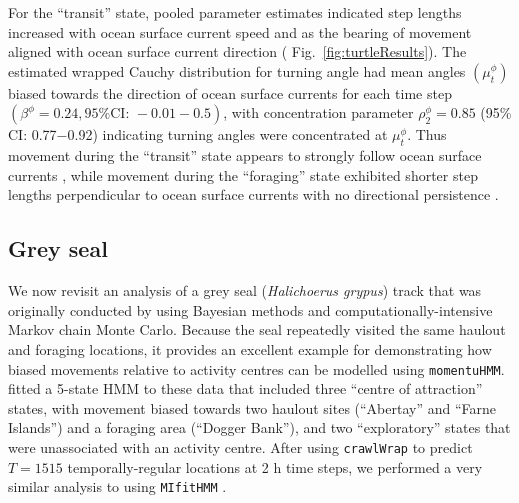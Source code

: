 \documentclass[12pt]{article}\usepackage[]{graphicx}\usepackage[]{color}
\begin{document}
For the ``transit'' state, pooled parameter estimates indicated step lengths increased with ocean surface current speed and as the bearing of movement aligned with ocean surface current direction (%
Fig.\ \ref{fig:turtleResults}). The estimated wrapped Cauchy distribution for turning angle had mean angles $(\mu^\phi_t)$ biased towards the direction of ocean surface currents for each time step $(\beta^\phi=0.24, \text{95\% CI: } -0.01-0.5)$, with concentration parameter $\rho^\phi_2=0.85$ (95\% CI: 0.77$-$0.92) indicating turning angles were concentrated at $\mu^\phi_t$. Thus movement during the ``transit'' state appears to strongly follow ocean surface currents%
, while movement during the ``foraging'' state exhibited shorter step lengths %
perpendicular to ocean surface currents %
with no directional persistence%
. %

\subsection{Grey seal}
\label{sec:greySeal}
We now revisit an analysis of a grey seal ({\it Halichoerus grypus}) track that was originally conducted by \cite{McClintockEtAl2012} using Bayesian methods and computationally-intensive Markov chain Monte Carlo. %
Because the seal repeatedly visited the same haulout and foraging locations, it provides an excellent example for demonstrating how biased movements relative to activity centres can be modelled using \verb|momentuHMM|. \cite{McClintockEtAl2012} fitted a 5-state HMM to these data that included three ``centre of attraction'' states, with movement biased towards two haulout sites (``Abertay'' and ``Farne Islands'') and a foraging area (``Dogger Bank''), and two ``exploratory'' states %
that were unassociated with an activity centre. After using \verb|crawlWrap| to predict $T=1515$ temporally-regular locations at 2 h time steps, we performed a very similar analysis to \cite{McClintockEtAl2012} using \verb|MIfitHMM| %
.
\end{document}
